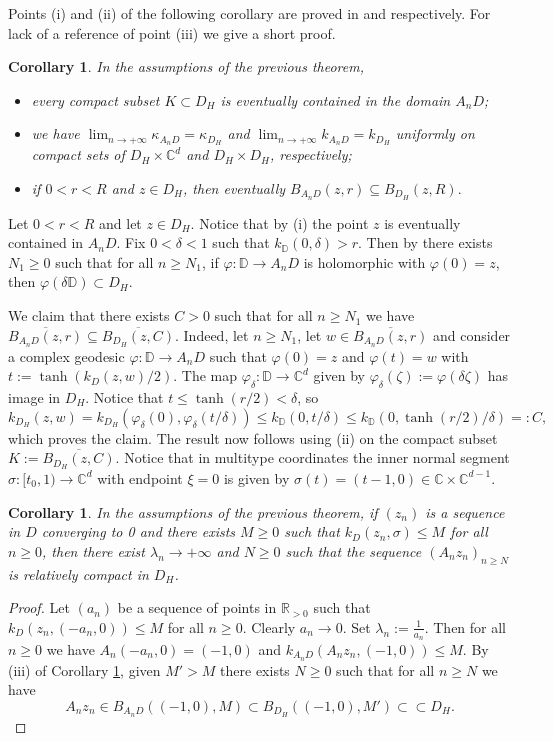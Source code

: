 \documentclass[11pt, reqno]{amsart}
\numberwithin{equation}{section}
\newtheorem{corollary}[theorem]{Corollary}
\theoremstyle{definition}
\newcommand{\C}{\mathbb{C}}
\newcommand{\D}{\mathbb{D}}
\newcommand{\R}{\mathbb{R}}
\begin{document}
{		Points (i) and (ii) of the following corollary are proved in \cite[Lemma 4.4]{Zim} and \cite[Theorem 9.1]{GausZim}   respectively. For lack of a reference of point (iii) we give a short proof.
		\begin{corollary}\label{zimmerconvergence}
			In the assumptions of the previous theorem,
			\begin{itemize}
				\item[(i)] every compact subset $K\subset D_H$ is eventually contained in the domain $A_nD$;
				\item[(ii)] we have $\lim_{n\to+\infty}\kappa_{A_nD}=\kappa_{D_H}$ and $\lim_{n\to+\infty}k_{A_nD}=k_{D_H}$
				uniformly on compact sets of $D_H\times\C^d$ and $D_H\times D_H$, respectively;
				\item[(iii)] if $0<r<R$ and $z\in D_H$, then eventually $B_{A_nD}(z,r)\subseteq B_{D_H}(z, R).$
			\end{itemize}
		\end{corollary}
		\proof
		Let $0<r<R$ and let $z\in D_H$. Notice that by (i) the point $z$ is eventually contained in $A_nD$.
		Fix $0<\delta<1$ such that $k_\D(0,\delta)>r$. Then by \cite[Lemma 4.6]{Zim} there exists $N_1\geq 0$ such that for all $n\geq N_1$, if $\varphi\colon \D\to A_nD$ is holomorphic with $\varphi(0)=z$, then $\varphi(\delta\D)\subset D_H$. 
		
		We claim that there exists $C> 0$ such that  for all $n\geq N_1$ we have $\overline{B_{A_nD}(z,r)}\subseteq \overline{B_{D_H}(z,C)}$. Indeed, let $n\geq N_1$, let $w\in \overline{B_{A_nD}(z,r)}$ and  consider  a complex geodesic $\varphi\colon \D\to A_nD$ such that $\varphi(0)=z$ and $\varphi(t)=w$ with $t:=\tanh(k_D(z,w)/2)$.
		The map $\varphi_\delta:\D\to \C^d$ given by $\varphi_\delta(\zeta):=\varphi(\delta\zeta)$ has image in $D_H$. Notice that $t\leq \tanh(r/2)<\delta$, so
		$$k_{D_H}(z,w)=k_{D_H}(\varphi_\delta(0),\varphi_\delta(t/\delta))\leq k_\D(0,t/\delta)\leq k_\D(0,\tanh(r/2)\slash\delta)=:C,$$
		which proves the claim. 
		The result now follows using (ii) on the compact subset $K:=\overline{B_{D_H}(z,C)}$.
		\endproof
		Notice that in  multitype coordinates the inner normal segment $\sigma\colon[t_0,1)\to\C^d$ with endpoint $\xi=0$ is given by 
			$\sigma(t)=(t-1,0)\in\C\times\C^{d-1}.$
		\begin{corollary}\label{scalingrelcomp}
			In the assumptions of the previous theorem,
			if  $(z_n)$ is a sequence in $D$ converging to 0 and there exists $M\geq 0$ such that $k_D(z_n,\sigma)\leq M$ for all $n\geq 0$, then there exist $\lambda_n\to +\infty$ and $N\geq 0$ such that the sequence
			$(A_nz_n)_{n\geq N}$ is relatively compact in $D_H$.
		\end{corollary}
		\begin{proof}
		 Let $(a_n)$ be a sequence of points in $\R_{>0}$   such that $k_D(z_n,(-a_n,0))\leq M$  for all $n\geq 0$. Clearly  $a_n\to 0$. Set $\lambda_n:=\frac{1}{a_n}.$ Then for all $n\geq 0$ we have  $A_n(-a_n,0)=(-1,0)$  and 
		$k_{A_nD}(A_nz_n,(-1,0))\leq M$. By (iii) of  Corollary  \ref{zimmerconvergence}, given  $M'>M$ there exists $N\geq 0$ such that for all $n\geq N$ we have 
		$$A_nz_n\in B_{A_nD}((-1,0),M)\subset B_{D_H}((-1,0),M')\subset\subset D_H.$$
		

\end{proof}}
\end{document}
